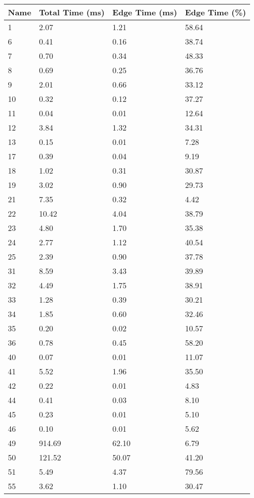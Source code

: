 \begin{tabular}{llll}
\toprule
Name & Total Time (ms) & Edge Time (ms) & Edge Time (\%)\\\midrule
1 & 2.07 & 1.21 & 58.64\\\midrule
6 & 0.41 & 0.16 & 38.74\\\midrule
7 & 0.70 & 0.34 & 48.33\\\midrule
8 & 0.69 & 0.25 & 36.76\\\midrule
9 & 2.01 & 0.66 & 33.12\\\midrule
10 & 0.32 & 0.12 & 37.27\\\midrule
11 & 0.04 & 0.01 & 12.64\\\midrule
12 & 3.84 & 1.32 & 34.31\\\midrule
13 & 0.15 & 0.01 & 7.28\\\midrule
17 & 0.39 & 0.04 & 9.19\\\midrule
18 & 1.02 & 0.31 & 30.87\\\midrule
19 & 3.02 & 0.90 & 29.73\\\midrule
21 & 7.35 & 0.32 & 4.42\\\midrule
22 & 10.42 & 4.04 & 38.79\\\midrule
23 & 4.80 & 1.70 & 35.38\\\midrule
24 & 2.77 & 1.12 & 40.54\\\midrule
25 & 2.39 & 0.90 & 37.78\\\midrule
31 & 8.59 & 3.43 & 39.89\\\midrule
32 & 4.49 & 1.75 & 38.91\\\midrule
33 & 1.28 & 0.39 & 30.21\\\midrule
34 & 1.85 & 0.60 & 32.46\\\midrule
35 & 0.20 & 0.02 & 10.57\\\midrule
36 & 0.78 & 0.45 & 58.20\\\midrule
40 & 0.07 & 0.01 & 11.07\\\midrule
41 & 5.52 & 1.96 & 35.50\\\midrule
42 & 0.22 & 0.01 & 4.83\\\midrule
44 & 0.41 & 0.03 & 8.10\\\midrule
45 & 0.23 & 0.01 & 5.10\\\midrule
46 & 0.10 & 0.01 & 5.62\\\midrule
49 & 914.69 & 62.10 & 6.79\\\midrule
50 & 121.52 & 50.07 & 41.20\\\midrule
51 & 5.49 & 4.37 & 79.56\\\midrule
55 & 3.62 & 1.10 & 30.47\\\midrule

\end{tabular}
